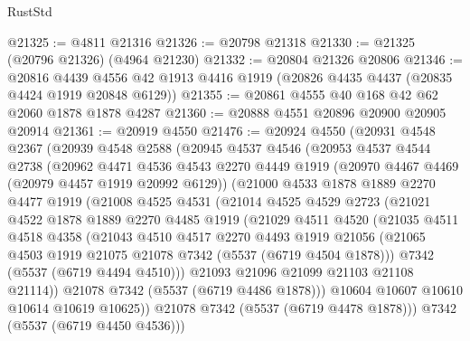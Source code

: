 \begin{lexlean}{RustStd}
\begin{coremodule}
@21325 := @4811 @21316
@21326 := @20798 @21318
@21330 := @21325 (@20796 @21326) (@4964 @21230)
@21332 := @20804 @21326 @20806
@21346 := @20816
    @4439
    @4556
    @42
    @1913
    @4416
    @1919
    (@20826 @4435 @4437 (@20835 @4424 @1919 @20848 @6129))
@21355 := @20861 @4555 @40 @168 @42 @62 @2060 @1878 @1878 @4287
@21360 := @20888 @4551 @20896 @20900 @20905 @20914
@21361 := @20919 @4550
@21476 := @20924
    @4550
    (@20931
      @4548
      @2367
      (@20939
        @4548
        @2588
        (@20945
          @4537
          @4546
          (@20953
            @4537
            @4544
            @2738
            (@20962
              @4471
              @4536
              @4543
              @2270
              @4449
              @1919
              (@20970 @4467 @4469 (@20979 @4457 @1919 @20992 @6129))
              (@21000
                @4533
                @1878
                @1889
                @2270
                @4477
                @1919
                (@21008
                  @4525
                  @4531
                  (@21014
                    @4525
                    @4529
                    @2723
                    (@21021
                      @4522
                      @1878
                      @1889
                      @2270
                      @4485
                      @1919
                      (@21029
                        @4511
                        @4520
                        (@21035
                          @4511
                          @4518
                          @4358
                          (@21043
                            @4510
                            @4517
                            @2270
                            @4493
                            @1919
                            @21056
                            (@21065 @4503 @1919 @21075 @21078 @7342 (@5537 (@6719 @4504 @1878)))
                            @7342
                            (@5537 (@6719 @4494 @4510)))
                          @21093
                          @21096
                          @21099
                          @21103
                          @21108
                          @21114))
                      @21078
                      @7342
                      (@5537 (@6719 @4486 @1878)))
                    @10604
                    @10607
                    @10610
                    @10614
                    @10619
                    @10625))
                @21078
                @7342
                (@5537 (@6719 @4478 @1878)))
              @7342
              (@5537 (@6719 @4450 @4536)))

\end{coremodule}
\end{lexlean}
